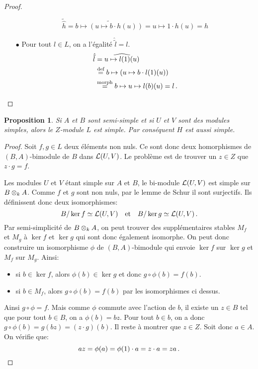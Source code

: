 \documentclass[francais,a4paper,11pt,reqno]{amsart}
\theoremstyle{plain}
\newtheorem{PROP}[THEO]{\bf Proposition}
\theoremstyle{definition}
\theoremstyle{remark}
\newcommand{\act}{\cdot}
\newcommand\eqcom[1]{\mathrel{\overset{\text{#1}}{=}}}
\begin{document}
\begin{proof}
\begin{itemize}
    \begin{equation}
      \tilde{\hat{h}} = \widetilde{b \mapsto (u \mapsto b\act h(u))}
      = u \mapsto 1\act h(u) = h
    \end{equation}
  \item[$\bullet$] Pour tout $l\in L$, on a l'égalité $\hat{\tilde{l}} = l$.
    \begin{align}
      \hat{\tilde{l}} &= \widehat{u \mapsto l(1)(u)}\\
      &\eqcom{def}b \mapsto (u \mapsto b\act l(1)(u)) \\
      &\eqcom{morph}b \mapsto u \mapsto l(b)(u) = l\,.\qedhere
    \end{align}
  \end{itemize}
\end{proof}

\begin{PROP}
  Si $A$ et $B$ sont semi-simple et si $U$ et $V$ sont des modules simples,
  alors le $Z$-module $L$ est simple. Par conséquent $H$ est aussi simple.
\end{PROP}
\begin{proof}
  Soit $f,g\in L$ deux éléments non nuls. Ce sont donc deux homorphismes de
  $(B, A)$-bimodule de $B$ dans $\operatorname{\mathcal L}(U,V)$. Le problème est de trouver un
  $z\in Z$ que $z\act g = f$.

  Les modules $U$ et $V$ étant simple sur $A$ et $B$, le bi-module $\operatorname{\mathcal L}(U,V)$
  est simple sur $B\otimes_k A$. Comme $f$ et $g$ sont non nuls, par le lemme
  de Schur il sont surjectifs. Ils définissent donc deux isomorphismes:
  \begin{equation}
    B / \ker{f} \simeq \operatorname{\mathcal L}(U,V)
    \quad\text{et}\quad
    B / \ker{g} \simeq \operatorname{\mathcal L}(U,V)\,.
  \end{equation}
  Par semi-simplicité de $B\otimes_k A$, on peut trouver des supplémentaires
  stables $M_f$ et $M_g$ à $\ker{f}$ et $\ker{g}$ qui sont donc également
  isomorphe. On peut donc construire un isomorphisme $\phi$ de
  $(B,A)$-bimodule qui envoie $\ker f$ sur $\ker g$ et $M_f$ sur $M_g$.
  Ainsi:
  \begin{itemize}
  \item si $b\in\ker f$, alors $\phi(b)\in\ker g$ et donc
    $g\circ \phi(b) = f(b)$.
  \item si $b\in M_f$, alors $g\circ \phi(b) = f(b)$ par les isomorphismes ci
    dessus.
  \end{itemize}
  Ainsi $g\circ \phi = f$. Mais comme $\phi$ commute avec l'action de $b$, il
  existe un $z\in B$ tel que pour tout $b\in B$, on a $\phi(b) = bz$. Pour
  tout $b\in b$, on a donc $g\circ \phi(b) = g(bz) = (z\act g)(b)$. Il reste à
  montrer que $z\in Z$. Soit donc $a\in A$. On vérifie que:
  \begin{equation}
    az = \phi(a) = \phi(1)\act a = z\act a = za\,.\qedhere
  \end{equation}
\end{proof}
\end{document}
